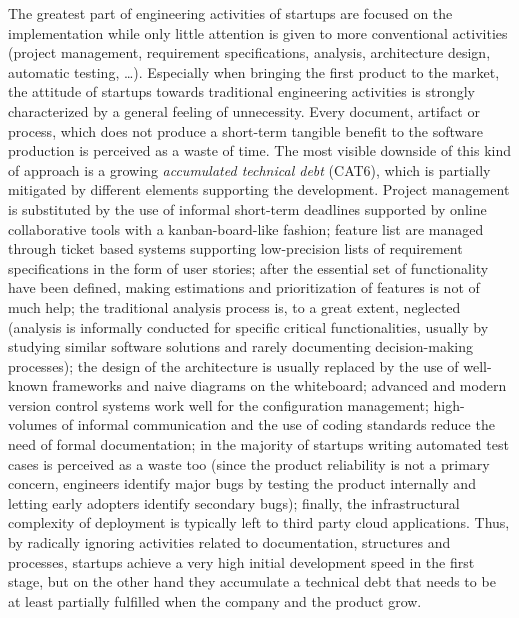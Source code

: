 \documentclass[10pt,journal,letterpaper,compsoc]{IEEEtran}
\begin{document}
\begin{compactitem}
\item The greatest part of engineering activities of startups are focused on 
the implementation while only little attention is given to more conventional 
activities (project management, requirement specifications, analysis, 
architecture design, automatic testing, \ldots). Especially when bringing the 
first product to the market, the attitude of startups towards traditional 
engineering activities is strongly characterized by a general feeling of 
unnecessity. Every document, artifact or process, which does not produce a 
short-term tangible benefit to the software production is perceived as a waste 
of time. The most visible downside of this kind of approach is a growing 
\textit{accumulated technical debt} (CAT6), which is partially mitigated by 
different elements supporting the development. Project management is substituted 
by the use of informal short-term deadlines supported by online collaborative 
tools with a kanban-board-like fashion; feature list are managed through ticket 
based systems supporting low-precision lists of requirement specifications in 
the form of user stories; after the essential set of functionality have been 
defined, making estimations and prioritization of features is not of much help; 
the traditional analysis process is, to a great extent, neglected (analysis is 
informally conducted for specific critical functionalities, usually by studying 
similar software solutions and rarely documenting decision-making processes); 
the design of the architecture is usually replaced by the use of well-known 
frameworks and naive diagrams on the whiteboard; advanced and modern version 
control systems work well for the configuration management; high-volumes of 
informal communication and the use of coding standards reduce the need of formal 
documentation; in the majority of startups writing automated test cases is 
perceived as a waste too (since the product reliability is not a primary 
concern,  engineers identify major bugs by testing the product internally and 
letting early adopters identify secondary bugs); finally, the infrastructural 
complexity of deployment is typically left to third party cloud applications.  
Thus, by radically ignoring activities related to documentation, structures and 
processes, startups achieve a very high initial development speed in the first 
stage, but on the other hand they accumulate a technical debt that needs to be 
at least partially fulfilled when the company and the product grow.


\end{compactitem}
\end{document}
